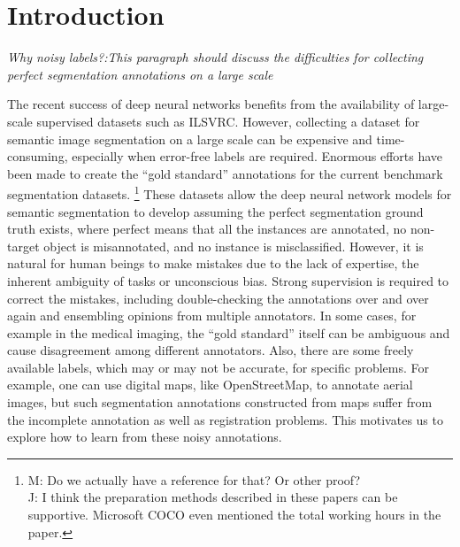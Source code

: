 \section{Introduction}
\label{introduction}

\noindent
\textit{Why noisy labels?:This paragraph should discuss the difficulties for collecting perfect segmentation annotations on a large scale}

\noindent
The recent success of deep neural networks benefits from the availability of large-scale supervised datasets such as ILSVRC\cite{russakovsky2015imagenet}.
However, collecting a dataset for semantic image segmentation on a large scale can be expensive and time-consuming, especially when error-free labels are required.
Enormous efforts have been made to create the ``gold standard'' annotations for the current benchmark segmentation datasets\cite{everingham2015pascal,mottaghi2014role,lin2014microsoft}.
\footnote{M: Do we actually have a reference for that?  Or other proof?\\J: I think the preparation methods described in these papers can be supportive. Microsoft COCO even mentioned the total working hours in the paper.}
These datasets allow the deep neural network models for semantic segmentation \cite{long2015fully,zheng2015conditional} to develop assuming the perfect segmentation ground truth exists, where perfect means that all the instances are annotated, no non-target object is misannotated, and no instance is misclassified.
However, it is natural for human beings to make mistakes due to the lack of expertise, the inherent ambiguity of tasks or unconscious bias.
Strong supervision is required to correct the mistakes, including double-checking the annotations over and over again and ensembling opinions from multiple annotators.
In some cases, for example in the medical imaging, the ``gold standard'' itself can be ambiguous and cause disagreement among different annotators.
Also, there are some freely available labels, which may or may not be accurate, for specific problems.
For example, one can use digital maps, like OpenStreetMap, to annotate aerial images, but such segmentation annotations constructed from maps suffer from the incomplete annotation as well as registration problems.\cite{mnih2012learning}
This motivates us to explore how to learn from these noisy annotations.

